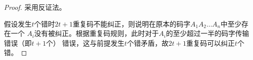 \begin{proof}
   采用反证法。

   假设发生$t$个错时$2t+1$重复码不能纠正，则说明在原本的码字$A_1A_2\ldots A_n$中至少存在一个
   $A_i$没有被纠正。根据重复码规则，此时对于$A_i$的至少超过一半的码字传输错误（即$t+1$个）
   错误，这与前提发生$t$个错矛盾，故$2t+1$重复码可以纠正$t$个错。
\end{proof}